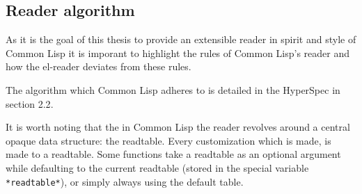 \documentclass[a4paper,10pt,twoside]{article}
\newcommand{\cl}{Common Lisp}
\newcommand{\elr}{el-reader}
\newcommand{\sym}[1]{\texttt{#1}}
\begin{document}






\subsection{Reader algorithm}
\label{subsec:read-algo}

As it is the goal of this thesis to provide an extensible reader in spirit and
style of \cl{} it is imporant to highlight the rules of \cl{}’s reader and how
the \elr{} deviates from these rules.

The algorithm which \cl{} adheres to is detailed in the HyperSpec in section
2.2\cite{hyperspec}.

It is worth noting that the in \cl{} the reader revolves around a central opaque
data structure: the readtable.  Every customization which is made, is made to a
readtable.  Some functions take a readtable as an optional argument while
defaulting to the current readtable (stored in the special variable
\sym{*readtable*}), or simply always using the default table.
\end{document}
